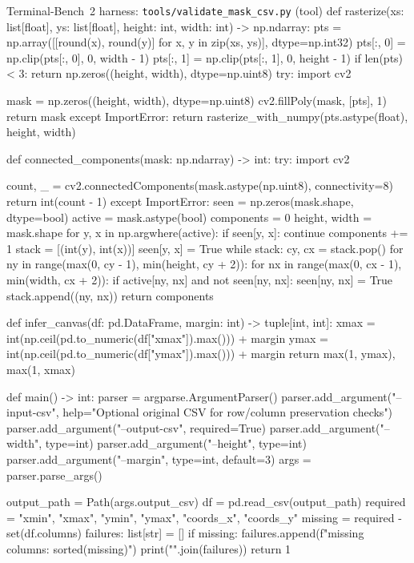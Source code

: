 \begin{promptbox}{Terminal-Bench~2 harness: \texttt{tools/validate\_mask\_csv.py} (tool)}
def rasterize(xs: list[float], ys: list[float], height: int, width: int) -> np.ndarray:
    pts = np.array([[round(x), round(y)] for x, y in zip(xs, ys)], dtype=np.int32)
    pts[:, 0] = np.clip(pts[:, 0], 0, width - 1)
    pts[:, 1] = np.clip(pts[:, 1], 0, height - 1)
    if len(pts) < 3:
        return np.zeros((height, width), dtype=np.uint8)
    try:
        import cv2

        mask = np.zeros((height, width), dtype=np.uint8)
        cv2.fillPoly(mask, [pts], 1)
        return mask
    except ImportError:
        return rasterize_with_numpy(pts.astype(float), height, width)


def connected_components(mask: np.ndarray) -> int:
    try:
        import cv2

        count, _ = cv2.connectedComponents(mask.astype(np.uint8), connectivity=8)
        return int(count - 1)
    except ImportError:
        seen = np.zeros(mask.shape, dtype=bool)
        active = mask.astype(bool)
        components = 0
        height, width = mask.shape
        for y, x in np.argwhere(active):
            if seen[y, x]:
                continue
            components += 1
            stack = [(int(y), int(x))]
            seen[y, x] = True
            while stack:
                cy, cx = stack.pop()
                for ny in range(max(0, cy - 1), min(height, cy + 2)):
                    for nx in range(max(0, cx - 1), min(width, cx + 2)):
                        if active[ny, nx] and not seen[ny, nx]:
                            seen[ny, nx] = True
                            stack.append((ny, nx))
        return components


def infer_canvas(df: pd.DataFrame, margin: int) -> tuple[int, int]:
    xmax = int(np.ceil(pd.to_numeric(df["xmax"]).max())) + margin
    ymax = int(np.ceil(pd.to_numeric(df["ymax"]).max())) + margin
    return max(1, ymax), max(1, xmax)


def main() -> int:
    parser = argparse.ArgumentParser()
    parser.add_argument("--input-csv", help="Optional original CSV for row/column preservation checks")
    parser.add_argument("--output-csv", required=True)
    parser.add_argument("--width", type=int)
    parser.add_argument("--height", type=int)
    parser.add_argument("--margin", type=int, default=3)
    args = parser.parse_args()

    output_path = Path(args.output_csv)
    df = pd.read_csv(output_path)
    required = {"xmin", "xmax", "ymin", "ymax", "coords_x", "coords_y"}
    missing = required - set(df.columns)
    failures: list[str] = []
    if missing:
        failures.append(f"missing columns: {sorted(missing)}")
        print("\n".join(failures))
        return 1


\end{promptbox}
